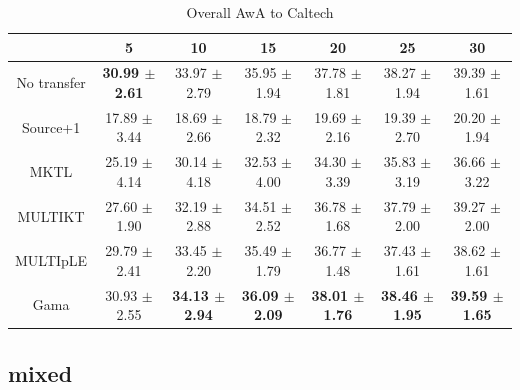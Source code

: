 \begin{table}[htbp]
  \centering
  \caption{Overall AwA to Caltech}
    \begin{tabular}{ccccccc}
    \toprule
                & 5              & 10             & 15             & 20             & 25             & 30 \\
    \midrule
    No transfer &         \textbf{30.99 $\pm$ 2.61} &         33.97 $\pm$ 2.79 &         35.95 $\pm$ 1.94 &         37.78 $\pm$ 1.81 &         38.27 $\pm$ 1.94 &         39.39 $\pm$ 1.61 \\
    Source+1    &         17.89 $\pm$ 3.44 &         18.69 $\pm$ 2.66 &         18.79 $\pm$ 2.32 &         19.69 $\pm$ 2.16 &         19.39 $\pm$ 2.70 &         20.20 $\pm$ 1.94 \\
    MKTL        &         25.19 $\pm$ 4.14 &         30.14 $\pm$ 4.18 &         32.53 $\pm$ 4.00 &         34.30 $\pm$ 3.39 &         35.83 $\pm$ 3.19 &         36.66 $\pm$ 3.22 \\
    MULTIKT     &         27.60 $\pm$ 1.90 &         32.19 $\pm$ 2.88 &         34.51 $\pm$ 2.52 &         36.78 $\pm$ 1.68 &         37.79 $\pm$ 2.00 &         39.27 $\pm$ 2.00 \\
    MULTIpLE    &         29.79 $\pm$ 2.41 &         33.45 $\pm$ 2.20 &         35.49 $\pm$ 1.79 &         36.77 $\pm$ 1.48 &         37.43 $\pm$ 1.61 &         38.62 $\pm$ 1.61 \\
    Gama        &         30.93 $\pm$ 2.55 &         \textbf{34.13 $\pm$ 2.94} &         \textbf{36.09 $\pm$ 2.09} &         \textbf{38.01 $\pm$ 1.76} &         \textbf{38.46 $\pm$ 1.95} &         \textbf{39.59 $\pm$ 1.65} \\
    \bottomrule
    \end{tabular}%
  \label{tab:addlabel}%
\end{table}%

\subsection{mixed}

